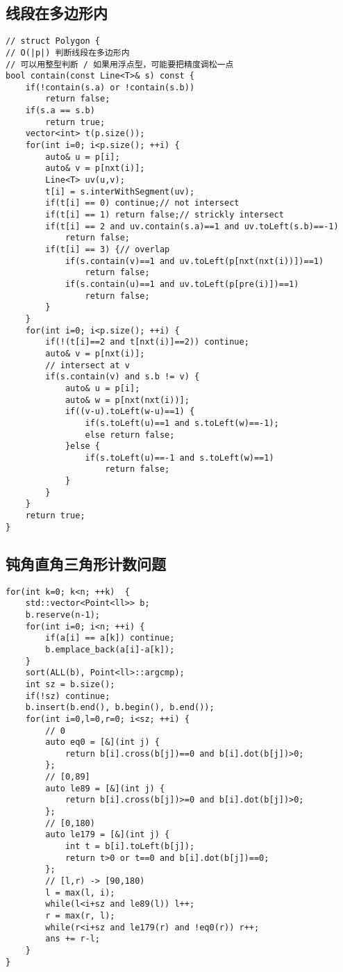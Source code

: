 \subsection{线段在多边形内}
\begin{lstlisting}
// struct Polygon {
// O(|p|) 判断线段在多边形内
// 可以用整型判断 / 如果用浮点型，可能要把精度调松一点
bool contain(const Line<T>& s) const {
    if(!contain(s.a) or !contain(s.b))
        return false;
    if(s.a == s.b)
        return true;
    vector<int> t(p.size());
    for(int i=0; i<p.size(); ++i) {
        auto& u = p[i];
        auto& v = p[nxt(i)];
        Line<T> uv(u,v);
        t[i] = s.interWithSegment(uv);
        if(t[i] == 0) continue;// not intersect
        if(t[i] == 1) return false;// strickly intersect
        if(t[i] == 2 and uv.contain(s.a)==1 and uv.toLeft(s.b)==-1)
            return false;
        if(t[i] == 3) {// overlap
            if(s.contain(v)==1 and uv.toLeft(p[nxt(nxt(i))])==1)
                return false;
            if(s.contain(u)==1 and uv.toLeft(p[pre(i)])==1)
                return false;
        }
    }
    for(int i=0; i<p.size(); ++i) {
        if(!(t[i]==2 and t[nxt(i)]==2)) continue;
        auto& v = p[nxt(i)];
        // intersect at v
        if(s.contain(v) and s.b != v) {
            auto& u = p[i];
            auto& w = p[nxt(nxt(i))];
            if((v-u).toLeft(w-u)==1) {
                if(s.toLeft(u)==1 and s.toLeft(w)==-1);
                else return false;
            }else {
                if(s.toLeft(u)==-1 and s.toLeft(w)==1)
                    return false;
            }
        }
    }
    return true;
}
\end{lstlisting}

\subsection{钝角直角三角形计数问题}
\begin{lstlisting}
for(int k=0; k<n; ++k)  {
    std::vector<Point<ll>> b;
    b.reserve(n-1);
    for(int i=0; i<n; ++i) {
        if(a[i] == a[k]) continue;
        b.emplace_back(a[i]-a[k]);
    }
    sort(ALL(b), Point<ll>::argcmp);
    int sz = b.size();
    if(!sz) continue;
    b.insert(b.end(), b.begin(), b.end());
    for(int i=0,l=0,r=0; i<sz; ++i) {
        // 0
        auto eq0 = [&](int j) {
            return b[i].cross(b[j])==0 and b[i].dot(b[j])>0;
        };
        // [0,89]
        auto le89 = [&](int j) {
            return b[i].cross(b[j])>=0 and b[i].dot(b[j])>0;
        };
        // [0,180)
        auto le179 = [&](int j) {
            int t = b[i].toLeft(b[j]);
            return t>0 or t==0 and b[i].dot(b[j])==0;
        };
        // [l,r) -> [90,180)
        l = max(l, i);
        while(l<i+sz and le89(l)) l++;
        r = max(r, l);
        while(r<i+sz and le179(r) and !eq0(r)) r++;
        ans += r-l;
    }
}
\end{lstlisting}

